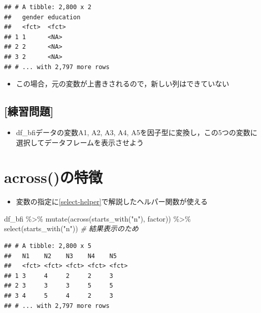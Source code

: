 \documentclass[
  xelatex,ja=standard, b5paper]{bxjsbook}
\newenvironment{Shaded}{\begin{snugshade}}{\end{snugshade}}
\newcommand{\CommentTok}[1]{\textcolor[rgb]{0.56,0.35,0.01}{\textit{#1}}}
\newcommand{\FunctionTok}[1]{\textcolor[rgb]{0.00,0.00,0.00}{#1}}
\newcommand{\NormalTok}[1]{#1}
\newcommand{\SpecialCharTok}[1]{\textcolor[rgb]{0.00,0.00,0.00}{#1}}
\newcommand{\StringTok}[1]{\textcolor[rgb]{0.31,0.60,0.02}{#1}}
\providecommand{\tightlist}{%
  \setlength{\itemsep}{0pt}\setlength{\parskip}{0pt}}
\begin{document}
\begin{verbatim}
## # A tibble: 2,800 x 2
##   gender education
##   <fct>  <fct>    
## 1 1      <NA>     
## 2 2      <NA>     
## 3 2      <NA>     
## # ... with 2,797 more rows
\end{verbatim}

\begin{itemize}
\tightlist
\item
  この場合，元の変数が上書きされるので，新しい列はできていない
\end{itemize}

\hypertarget{ux7df4ux7fd2ux554fux984c-10}{%
\subsection{{[}練習問題{]}}\label{ux7df4ux7fd2ux554fux984c-10}}

\begin{itemize}
\tightlist
\item
  df\_bfiデータの変数A1, A2, A3, A4, A5を因子型に変換し，この5つの変数に選択してデータフレームを表示させよう
\end{itemize}

\hypertarget{mu-across}{%
\section{across()の特徴}\label{mu-across}}

\begin{itemize}
\tightlist
\item
  変数の指定に\ref{select-helper}で解説したヘルパー関数が使える
\end{itemize}

\begin{Shaded}
\begin{Highlighting}[]
\NormalTok{df\_bfi }\SpecialCharTok{\%\textgreater{}\%}
  \FunctionTok{mutate}\NormalTok{(}\FunctionTok{across}\NormalTok{(}\FunctionTok{starts\_with}\NormalTok{(}\StringTok{"n"}\NormalTok{),}
\NormalTok{                factor)) }\SpecialCharTok{\%\textgreater{}\%} 
  \FunctionTok{select}\NormalTok{(}\FunctionTok{starts\_with}\NormalTok{(}\StringTok{"n"}\NormalTok{))   }\CommentTok{\# 結果表示のため}
\end{Highlighting}
\end{Shaded}

\begin{verbatim}
## # A tibble: 2,800 x 5
##   N1    N2    N3    N4    N5   
##   <fct> <fct> <fct> <fct> <fct>
## 1 3     4     2     2     3    
## 2 3     3     3     5     5    
## 3 4     5     4     2     3    
## # ... with 2,797 more rows
\end{verbatim}
\end{document}
